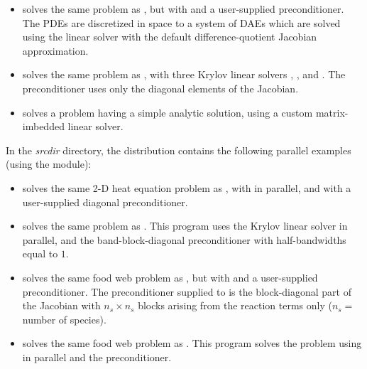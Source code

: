 \begin{itemize}
\item {}
  solves the same problem as , but with {\sunlinsolspgmr}
  and a user-supplied preconditioner.
  The PDEs are discretized in space to a system of DAEs which are solved
  using the {\sunlinsolband} linear solver with the default difference-quotient 
  Jacobian approximation.

\item {}
  solves the same problem as , with three Krylov linear solvers
  {\sunlinsolspgmr}, {\sunlinsolspbcgs}, and {\sunlinsolsptfqmr}.  The
  preconditioner uses only the diagonal elements of the Jacobian.

\item {} solves a problem having a simple analytic
  solution, using a custom matrix-imbedded linear solver.


\end{itemize}

\vspace{0.2in}\noindent
In the {\em srcdir} directory, the {\ida} 
distribution contains the following parallel examples 
(using the {\nvecp} module):
\begin{itemize}

\item {}
  solves the same 2-D heat equation problem as , with
  {\sunlinsolspgmr} in parallel, and with a user-supplied diagonal preconditioner.
  
\item {}
  solves the same problem as .
  This program  uses the Krylov linear solver {\sunlinsolspgmr} in parallel, and the
  band-block-diagonal preconditioner {\idabbdpre} with half-bandwidths equal to $1$.

\item {}
  solves the same food web problem as , but with {\sunlinsolspgmr}
  and a user-supplied preconditioner.
  The preconditioner supplied to {\sunlinsolspgmr} is the block-diagonal part of 
  the Jacobian with $n_s \times n_s$ blocks arising from the reaction terms only
  ($n_s =$ number of species).

\item {}
  solves the same food web problem as .
  This program solves the problem using {\sunlinsolspgmr} in parallel and the
  {\idabbdpre} preconditioner.

\end{itemize}

